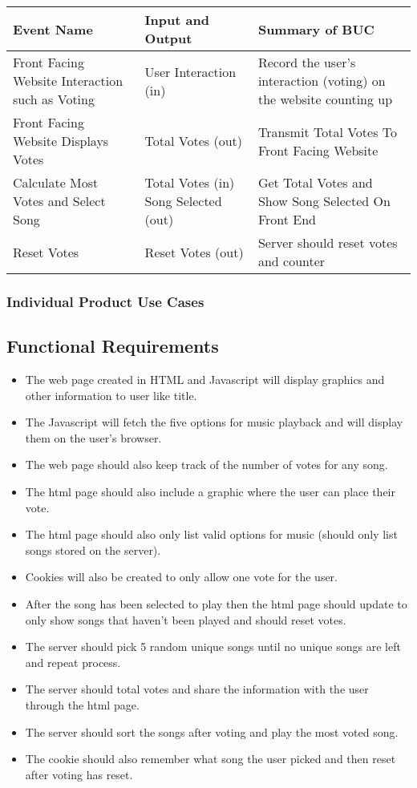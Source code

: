 \documentclass[12pt, titlepage]{article}
\begin{document}
\begin{center}
\begin{table}[H]
\begin{tabularx}{\textwidth}{| X | X | X |}
\hline
\textbf{Event Name} &\textbf{Input and Output} &\textbf{Summary of BUC}  \\
\hline
Front Facing Website Interaction such as Voting & User Interaction (in) & Record the user's interaction (voting) on the website counting up\\
\hline
Front Facing Website Displays Votes  & Total Votes (out) & Transmit Total Votes To Front Facing Website \\
\hline
 Calculate Most Votes and Select Song & Total Votes (in)
Song Selected (out) & Get Total Votes and Show Song Selected On Front End\\
\hline
Reset Votes & Reset Votes (out) & Server should reset votes and counter \\
\hline
\end{tabularx}
\end{table}
\end{center}

\subsubsection{Individual Product Use Cases}

\subsection{Functional Requirements}
\begin{itemize}
\item The web page created in HTML and Javascript will display graphics and other information to user like title.
\item The Javascript will fetch the five options for music playback and will display them on the user's browser.
\item The web page should also keep track of the number of votes for any song.
\item The html page should also include a graphic where the user can place their vote.
\item The html page should also only list valid options for music (should only list songs stored on the server).
\item Cookies will also be created to only allow one vote for the user.
\item After the song has been selected to play then the html page should update to only show songs that haven't been played and should reset votes.
\item The server should pick 5 random unique songs until no unique songs are left and repeat process.
\item The server should total votes and share the information with the user through the html page.
\item The server should sort the songs after voting and play the most voted song.
\item The cookie should also remember what song the user picked and then reset after voting has reset.
\end{itemize}
\end{document}
